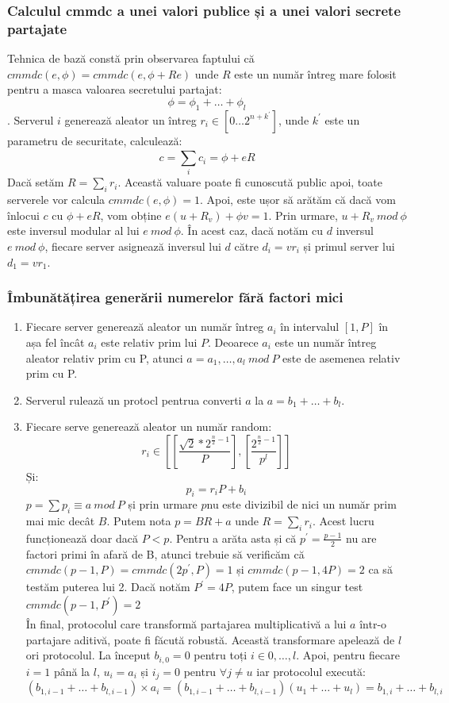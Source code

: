 \documentclass[12pt, oneside]{book}
\begin{document}
\subsubsection{Calculul cmmdc a unei valori publice și a unei valori secrete partajate}
Tehnica de bază constă prin observarea faptului că $cmmdc(e,\phi)=cmmdc(e,\phi + Re)$ unde $R$ este un număr întreg mare folosit pentru a masca valoarea secretului partajat:
$$\phi=\phi_1+ \dots +\phi _l$$.
Serverul $i$ generează aleator un întreg $r_i \in [0  \dots  2^{n+k^{'}}]$, unde $k^{'}$ este un parametru de securitate, calculează:
$$ c = \sum_{i}^{} c_i = \phi + eR$$
Dacă setăm $R=\sum_i r_i$. Această valuare poate fi cunoscută public apoi, toate serverele vor calcula $cmmdc(e,\phi)=1$. Apoi, este ușor să arătăm că dacă vom înlocui $c$ cu $\phi + eR$, vom obține $e(u + R_v) + \phi v = 1$. Prin urmare, $u + R_v \ mod \ \phi$ este inversul modular al lui $e \ mod \ \phi$. În acest caz, dacă notăm cu $d$ inversul $e \ mod \ \phi$, fiecare server asignează inversul lui $d$ către $d_i = vr_i$ și primul server lui $d_1= vr_1$.
\subsubsection{Îmbunătățirea generării numerelor fără factori mici}
\begin{enumerate}
\item Fiecare server generează aleator un număr întreg $a_i$ în intervalul $[1,P]$ în așa fel încât $a_i$ este relativ prim lui $P$. Deoarece $a_i$ este un număr întreg aleator relativ prim cu P, atunci $a=a_1, \dots ,a_l \ mod \ P$ este de asemenea relativ prim cu P.

\item Serverul rulează un protocl pentrua converti $a$ la $a=b_1+ \dots +b_l$.

\item Fiecare serve generează aleator un număr random:
$$r_i \in \left[  [ \frac{\sqrt{2}* 2^{\frac{n}{2} -1} }{P}   ], [\frac{2^{\frac{n}{2}-1}}{p^l}]      \right] $$
Și:
$$ p_i=r_i P + b_i$$
$p = \sum p_i \equiv a \ mod \ P$ și prin urmare $p$nu este divizibil de nici un număr prim mai mic decât $B$. Putem nota $p=BR +a$ unde $R=\sum_{i} r_i$. Acest lucru funcționează doar dacă $P<p$. Pentru a arăta asta și că $p^{'} = \frac{p-1}{2}$ nu are factori primi în afară de B, atunci trebuie să verificăm că $cmmdc(p-1,P)=cmmdc(2p^{'},P)=1$ și $cmmdc(p-1,4P)=2$ ca să testăm puterea lui 2. Dacă notăm $P^{'}=4P$, putem face un singur test $cmmdc(p-1,P^{'})=2$\\
În final, protocolul care transformă partajarea multiplicativă a lui $a$ într-o partajare aditivă, poate fi făcută robustă. Această transformare apelează de $l$ ori protocolul. La început $b_{i,0}=0$ pentru toți $i \in {0, \dots ,l}$. Apoi, pentru fiecare $i=1$ până la $l$, $u_i=a_i$ și $i_j=0$ pentru $\forall j \neq u$ iar protocolul execută: 
$$(b_{1,i-1}+ \dots +b_{l,i-1}) \times a_i = (b_{1,i-1}+ \dots +b_{l,i-1})(u_1+ \dots +u_l)=b_{1,i}+ \dots +b_{l,i}$$
\end{enumerate}
\end{document}
